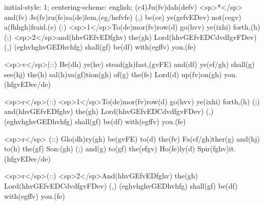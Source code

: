 initial-style: 1;
centering-scheme: english;
(c4)Ju(fv)dah(defv) <sp>*</sp> and(fv) Je(fv)ru(fe)sa(de)lem,(eg/hefvfe) (,) be(ce) ye(gefvEDev) not(cegv) a(fhhgh)fraid.(e) (:) <sp>1</sp>To(de)mor(fv)row(d) go(hvv) ye(ixhi) forth,(h) (;) <sp>2</sp>and(hhvGEfvEDfghv) the(gh) Lord(hhvGEfvEDCdvdfgvFDev) (,) (eghvhghvGEDhvhfg) shall(gf) be(df) with(egffv) you.(fe) 

<sp>v</sp>(::) Be(dh) ye(hv) stead(gh)fast,(gvFE) and(df) ye(ef/gh) shall(g) see(hj) the(h) sal(h)va(gf)tion(gh) of(g) the(fe) Lord(d) up(fv)on(gh) you.(hfgvEDec/de) 

<sp>r</sp>(::) <sp>1</sp>To(de)mor(fv)row(d) go(hvv) ye(ixhi) forth,(h) (;) and(hhvGEfvEDfghv) the(gh) Lord(hhvGEfvEDCdvdfgvFDev) (,) (eghvhghvGEDhvhfg) shall(gf) be(df) with(egffv) you.(fe) 

<sp>r</sp> (::) Glo(dh)ry(gh) be(gvFE) to(d) the(fv) Fa(ef/gh)ther(g) and(hj) to(h) the(gf) Son:(gh) (;) and(g) to(gf) the(efgv) Ho(fe)ly(d) Spir(fghv)it.(hfgvEDec/de)

<sp>r</sp>(::) <sp>2</sp>And(hhvGEfvEDfghv) the(gh) Lord(hhvGEfvEDCdvdfgvFDev) (,) (eghvhghvGEDhvhfg) shall(gf) be(df) with(egffv) you.(fe) 